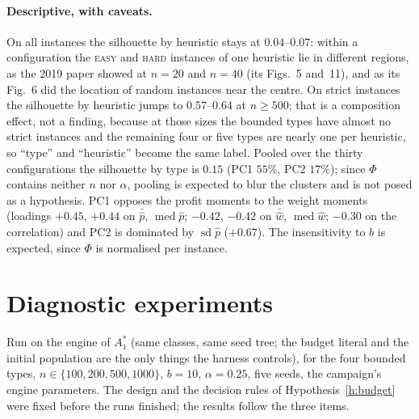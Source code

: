 \documentclass[a4paper,11pt]{article}
\newcommand{\Astar}{A_{1}^{*}}
\theoremstyle{plain}
\theoremstyle{definition}
\theoremstyle{remark}
\begin{document}
\paragraph{Descriptive, with caveats.} On all instances the silhouette by heuristic stays at
$0.04$--$0.07$: within a configuration the \textsc{easy} and \textsc{hard} instances of one
heuristic lie in different regions, as the 2019 paper showed at $n=20$ and $n=40$ (its
Figs.~5 and~11), and as its Fig.~6 did the location of random instances near the centre. On strict instances the silhouette by heuristic jumps to
$0.57$--$0.64$ at $n\ge500$; that is a composition effect, not a finding, because at those
sizes the bounded types have almost no strict instances and the remaining four or five types
are nearly one per heuristic, so ``type'' and ``heuristic'' become the same label. Pooled over
the thirty configurations the silhouette by type is $0.15$ (PC1 $55\%$, PC2 $17\%$); since
$\Phi$ contains neither $n$ nor $\alpha$, pooling is expected to blur the clusters and is not
posed as a hypothesis. PC1 opposes the profit moments to the weight moments (loadings $+0.45$,
$+0.44$ on $\bar{\hat p}$, $\operatorname{med}\hat p$; $-0.42$, $-0.42$ on $\bar{\hat w}$,
$\operatorname{med}\hat w$; $-0.30$ on the correlation) and PC2 is dominated by
$\operatorname{sd}\hat p$ ($+0.67$). The insensitivity to $b$ is expected, since $\Phi$ is
normalised per instance.

\section{Diagnostic experiments}\label{sec:experiments}

Run on the engine of $\Astar$ (same classes, same seed tree; the budget literal and the
initial population are the only things the harness controls), for the four bounded types,
$n\in\{100,200,500,1000\}$, $b=10$, $\alpha=0.25$, five seeds, the campaign's engine
parameters. The design and the decision rules of Hypothesis~\ref{h:budget} were fixed before
the runs finished; the results follow the three items.
\end{document}
